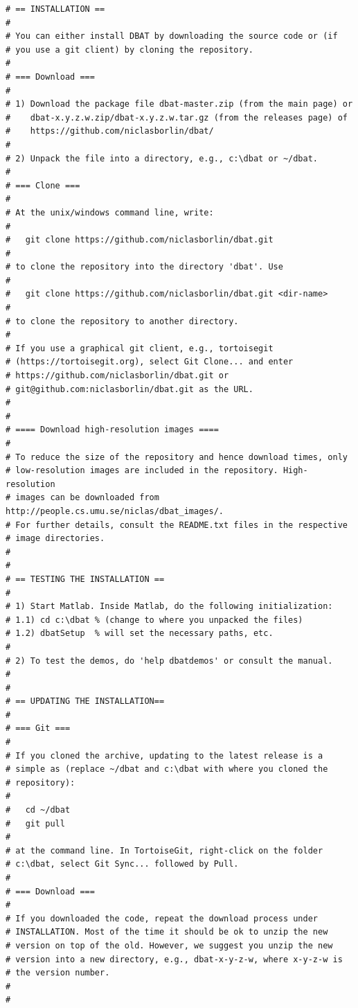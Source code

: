 \documentclass{article}
\begin{document}
\begin{verbatim}
# == INSTALLATION ==
#
# You can either install DBAT by downloading the source code or (if
# you use a git client) by cloning the repository.
#
# === Download ===
#
# 1) Download the package file dbat-master.zip (from the main page) or
#    dbat-x.y.z.w.zip/dbat-x.y.z.w.tar.gz (from the releases page) of
#    https://github.com/niclasborlin/dbat/
#
# 2) Unpack the file into a directory, e.g., c:\dbat or ~/dbat.
#
# === Clone ===
#
# At the unix/windows command line, write:
#
#   git clone https://github.com/niclasborlin/dbat.git
#
# to clone the repository into the directory 'dbat'. Use
#
#   git clone https://github.com/niclasborlin/dbat.git <dir-name>
#
# to clone the repository to another directory.
#
# If you use a graphical git client, e.g., tortoisegit
# (https://tortoisegit.org), select Git Clone... and enter
# https://github.com/niclasborlin/dbat.git or
# git@github.com:niclasborlin/dbat.git as the URL.
#
#
# ==== Download high-resolution images ====
#
# To reduce the size of the repository and hence download times, only
# low-resolution images are included in the repository. High-resolution 
# images can be downloaded from http://people.cs.umu.se/niclas/dbat_images/.
# For further details, consult the README.txt files in the respective
# image directories.
#
#
# == TESTING THE INSTALLATION ==
#
# 1) Start Matlab. Inside Matlab, do the following initialization:
# 1.1) cd c:\dbat % (change to where you unpacked the files)
# 1.2) dbatSetup  % will set the necessary paths, etc.
#
# 2) To test the demos, do 'help dbatdemos' or consult the manual.
#
#
# == UPDATING THE INSTALLATION==
#
# === Git ===
#
# If you cloned the archive, updating to the latest release is a
# simple as (replace ~/dbat and c:\dbat with where you cloned the
# repository):
#
#   cd ~/dbat
#   git pull
#
# at the command line. In TortoiseGit, right-click on the folder
# c:\dbat, select Git Sync... followed by Pull.
#
# === Download ===
#
# If you downloaded the code, repeat the download process under
# INSTALLATION. Most of the time it should be ok to unzip the new
# version on top of the old. However, we suggest you unzip the new
# version into a new directory, e.g., dbat-x-y-z-w, where x-y-z-w is
# the version number.
#
#
\end{verbatim}

\newpage
\end{document}
